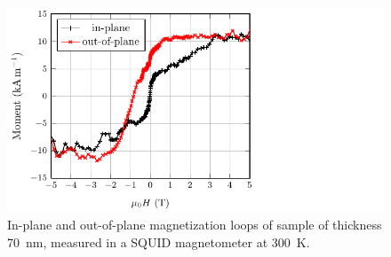 \documentclass[reprint,aip,apl,floatfix,linenumbers,superscriptaddress]{revtex4-1}
\begin{document}
\begin{figure}
\includegraphics[width=1.5\columnwidth]{Transport-Fig1.pdf}
\caption{In-plane and out-of-plane magnetization loops of  sample of thickness \SI{70}{\nano\metre}, measured in a SQUID magnetometer at \SI{300}{\kelvin}.}
\label{fig:squid}
\end{figure}
\end{document}
